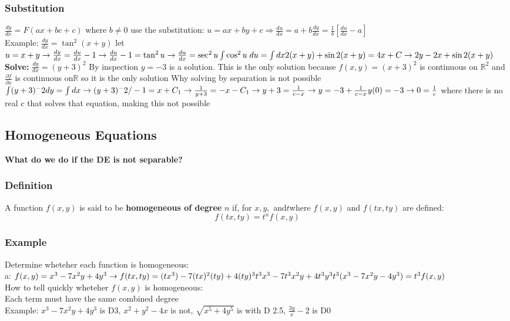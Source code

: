 \documentclass{article}
\begin{document}
\subsubsection{Substitution} $\frac{dy}{dx} = F(ax+bc+c)$ where $b\neq 0$ use the substitution: $u=ax+by+c \Rightarrow \frac{du}{dx} = a+b\frac{dy}{dx} = \frac{1}{b}\left[\frac{du}{dx}-a\right]$
\\Example: $\frac{dy}{dx} = \tan^2(x+y)$ let $u=x+y \rightarrow \frac{dy}{dx}=\frac{du}{dx}-1 \rightarrow \frac{du}{dx}-1=\tan^2 u \rightarrow \frac{du}{dx} = \sec ^2 u \\ \int \cos^2 u \; du = \int dx \\ 2(x+y)+\sin2(x+y) = 4x+C \rightarrow 2y-2x+\sin2(x+y)$
\\ \textbf{Solve:}
$\frac{dy}{dx} = (y+3)^2$ By inspection $y=-3$ is a solution. This is the only solution because $f(x,y)=(x+3)^2$ is continuous on $\mathbb{R}^2$ and $\frac{\partial f}{\partial x}$ is continuous on$ \mathbb{R}$ so it is the only solution
Why solving by separation is not possible
$\int (y+3)^-2 dy=\int dx \rightarrow (y+3)^-2/-1=x+C_1 \rightarrow \frac{1}{y+3}=-x-C_1 \rightarrow y+3 = \frac{1}{c-x} \rightarrow y=-3+\frac{1}{c-x}
\\y(0)=-3\rightarrow 0=\frac{1}{c}$ where there is no real c that solves that equation, making this not possible
\subsection{Homogeneous Equations} 
\textbf{What do we do if the DE is not separable?}
\subsubsection{Definition} A function $f(x,y)$ is said to be \textbf{homogeneous of degree} $n$ if, for $x, y,$ and$ t $where $f(x,y)$ and $f(tx,ty)$ are defined: \\$$f(tx,ty)=t^nf(x,y)$$
\subsubsection{Example} Determine wheteher each function is homogeneous: \\
a: $ f(x,y)=x^3-7x^2y+4y^3 \rightarrow f(tx,ty)=(tx^3)-7(tx)^2(ty)+4(ty)^3\\t^3x^3-7t^3x^2y+4t^3y^3\\t^3(x^3-7x^2y-4y^3)=t^3f(x,y)$
\\How to tell quickly wheteher $f(x,y)$ is homogeneous:
\\Each term must have the same combined degree
\\Example: $x^3-7x^2y+4y^3$ is D3, $x^2+y^2-4x$ is not, $\sqrt{x^5+4y^5}$ is with D 2.5, $\frac{3y}{x}-2$ is D0
\end{document}
